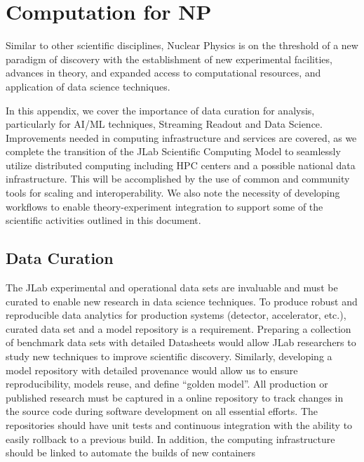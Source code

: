 \section{Computation for NP} 
\label{sec:appendixd}
Similar to other scientific disciplines, Nuclear Physics is on the threshold of a new paradigm of discovery with the establishment of new experimental facilities, advances in theory, and expanded access to computational resources, and application of data science techniques.  

In this appendix, we cover the importance of data curation for analysis, particularly for AI/ML techniques, Streaming Readout and Data Science.  Improvements needed in computing infrastructure and services are covered, as we complete the transition of the JLab Scientific Computing Model to seamlessly utilize distributed computing including HPC centers and a possible national data infrastructure.  This will be accomplished by the use of common and community tools for scaling and interoperability. We also note the necessity of developing workflows to enable theory-experiment integration to support some of the scientific activities outlined in this document.  


\subsection{Data Curation}
The JLab experimental and operational data sets are invaluable and must be curated to enable new research in data science techniques. To produce robust and reproducible data analytics for production systems (detector, accelerator, etc.), curated data set and a model repository is a requirement.  Preparing a collection of benchmark data sets with detailed Datasheets would allow JLab researchers to study new techniques to improve scientific discovery. Similarly, developing a model repository with detailed provenance would allow us to ensure reproducibility, models reuse, and define ``golden model''.  All production or published research must be captured in a online repository to track changes in the source code during software development on all essential efforts. The repositories should have unit tests and continuous integration with the ability to easily rollback to a previous build. In addition, the computing infrastructure should be linked to automate the builds of new containers


